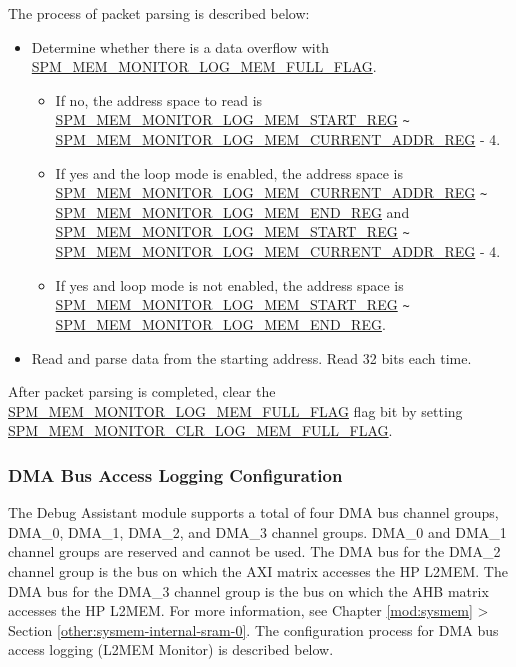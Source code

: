\documentclass[main\_\_EN.tex]{subfiles}
\begin{document}
The process of packet parsing is described below:

\begin{itemize}
    \item Determine whether there is a data overflow with \hyperref[fielddesc:SPMMEMMONITORLOGMEMFULLFLAG]{SPM\_MEM\_MONITOR\_LOG\_MEM\_FULL\_FLAG}.
    \begin{itemize}
        \item If no, the address space to read is \hyperref[regdesc:SPMMEMMONITORLOGMEMSTARTREG]{SPM\_MEM\_MONITOR\_LOG\_MEM\_START\_REG}  \verb+~+ \hyperref[regdesc:SPMMEMMONITORLOGMEMCURRENTADDRREG]{SPM\_MEM\_MONITOR\_LOG\_MEM\_CURRENT\_ADDR\_REG} - 4. \item If yes and the loop mode is enabled, the address space is \hyperref[regdesc:SPMMEMMONITORLOGMEMCURRENTADDRREG]{SPM\_MEM\_MONITOR\_LOG\_MEM\_CURRENT\_ADDR\_REG} \verb+~+ \hyperref[regdesc:SPMMEMMONITORLOGMEMENDREG]{SPM\_MEM\_MONITOR\_LOG\_MEM\_END\_REG} and \hyperref[regdesc:SPMMEMMONITORLOGMEMSTARTREG]{SPM\_MEM\_MONITOR\_LOG\_MEM\_START\_REG} \verb+~+ \hyperref[regdesc:SPMMEMMONITORLOGMEMCURRENTADDRREG]{SPM\_MEM\_MONITOR\_LOG\_MEM\_CURRENT\_ADDR\_REG} - 4. \item If yes and loop mode is not enabled, the address space is \hyperref[regdesc:SPMMEMMONITORLOGMEMSTARTREG]{SPM\_MEM\_MONITOR\_LOG\_MEM\_START\_REG} \verb+~+ \hyperref[regdesc:SPMMEMMONITORLOGMEMENDREG]{SPM\_MEM\_MONITOR\_LOG\_MEM\_END\_REG}.
    \end{itemize}
    \item Read and parse data from the starting address. Read 32 bits each time.
\end{itemize}

After packet parsing is completed, clear the \hyperref[fielddesc:SPMMEMMONITORLOGMEMFULLFLAG]{SPM\_MEM\_MONITOR\_LOG\_MEM\_FULL\_FLAG} flag bit by setting \hyperref[fielddesc:SPMMEMMONITORCLRLOGMEMFULLFLAG]{SPM\_MEM\_MONITOR\_CLR\_LOG\_MEM\_FULL\_FLAG}.


\subsubsection{DMA Bus Access Logging Configuration}

The Debug Assistant module supports a total of four DMA bus channel groups, DMA\_0, DMA\_1, DMA\_2, and DMA\_3 channel groups. DMA\_0 and DMA\_1 channel groups are reserved and cannot be used. The DMA bus for the DMA\_2 channel group is the bus on which the AXI matrix accesses the HP L2MEM. The DMA bus for the DMA\_3 channel group is the bus on which the AHB matrix accesses the HP L2MEM. For more information, see Chapter \ref{mod:sysmem} \textit{} > Section \ref{other:sysmem-internal-sram-0}. The configuration process for DMA bus access logging (L2MEM Monitor) is described below.
\end{document}
